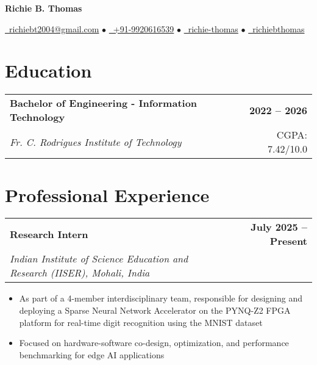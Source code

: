 \documentclass[10pt,a4paper]{article}
\makeatletter
\newcommand{\resumeItem}[1]{\item\small{#1}}
\newcommand{\resumeSubheading}[4]{
  \vspace{-1pt}
  \begin{tabular*}{\textwidth}[t]{l@{\extracolsep{\fill}}r}
    \textbf{#1} & \textcolor{light}{\small\textbf{#2}} \\
    \textit{\small#3} & \textcolor{light}{\small#4} \\
  \end{tabular*}\vspace{-5pt}
}
\makeatother
\begin{document}
\begin{center}
    {\LARGE\bfseries\color{primary} Richie B. Thomas}
    
    \vspace{0.3em}
    
    \href{mailto:richiebt2004@gmail.com}{\faEnvelope\ richiebt2004@gmail.com} $\bullet$
    \href{tel:+919920616539}{\faMobile\ +91-9920616539} $\bullet$
    \href{https://www.linkedin.com/in/richie-thomas/}{\faLinkedin\ richie-thomas} $\bullet$
    \href{https://github.com/richiebthomas}{\faGithub\ richiebthomas}
\end{center}

\vspace{0.2em}

\section{Education}

\resumeSubheading
{Bachelor of Engineering - Information Technology}{2022 -- 2026}
{Fr. C. Rodrigues Institute of Technology}{CGPA: 7.42/10.0}

\vspace{0.1em}

\section{Professional Experience}

\resumeSubheading
{Research Intern}{July 2025 -- Present}
{Indian Institute of Science Education and Research (IISER), Mohali, India}{}
\begin{itemize}
    \resumeItem{As part of a 4-member interdisciplinary team, responsible for designing and deploying a Sparse Neural Network Accelerator on the PYNQ-Z2 FPGA platform for real-time digit recognition using the MNIST dataset}
    \resumeItem{Focused on hardware-software co-design, optimization, and performance benchmarking for edge AI applications}
\end{itemize}
\end{document}
